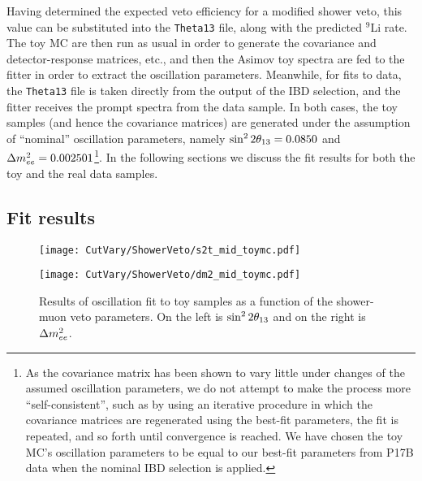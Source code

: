 \documentclass[../thesis.tex]{subfiles}
\begin{document}
Having determined the expected veto efficiency for a modified shower veto, this value can be substituted into the \texttt{Theta13} file, along with the predicted $^9$Li rate. The toy MC are then run as usual in order to generate the covariance and detector-response matrices, etc., and then the Asimov toy spectra are fed to the fitter in order to extract the oscillation parameters. Meanwhile, for fits to data, the \texttt{Theta13} file is taken directly from the output of the IBD selection, and the fitter receives the prompt spectra from the data sample. In both cases, the toy samples (and hence the covariance matrices) are generated under the assumption of ``nominal'' oscillation parameters, namely $\sin^2 2\theta_{13} = 0.0850$ and $\Delta m^2_{ee} = 0.002501$\footnote{As the covariance matrix has been shown to vary little under changes of the assumed oscillation parameters, we do not attempt to make the process more ``self-consistent'', such as by using an iterative procedure in which the covariance matrices are regenerated using the best-fit parameters, the fit is repeated, and so forth until convergence is reached. We have chosen the toy MC's oscillation parameters to be equal to our best-fit parameters from P17B data when the nominal IBD selection is applied.}. In the following sections we discuss the fit results for both the toy and the real data samples.

\begin{comment}
Regarding results: Don't comment on ``structure'' until we've regenerated the 2D plots using the fix to SinglesCalc::calcSinglesHz. (Accidentals rate might have been biased, throwing off the fit.)
\end{comment}

\subsection{Fit results}%
\label{sec:cutVaryMuVetoDataResults}

\begin{figure}[ht]
  \begin{minipage}{0.5\linewidth}%
    \texttt{[image: CutVary/ShowerVeto/s2t\_mid\_toymc.pdf]}%
  \end{minipage}%
  \begin{minipage}{0.5\linewidth}%
    \texttt{[image: CutVary/ShowerVeto/dm2\_mid\_toymc.pdf]}%
  \end{minipage}%
  \caption{Results of oscillation fit to toy samples as a function of the shower-muon veto parameters. On the left is $\sin^2 2\theta_{13}$ and on the right is $\Delta m^2_{ee}$. \marknom}
  \label{fig:cutVaryVetoEffToyResults}
\end{figure}
\end{document}
